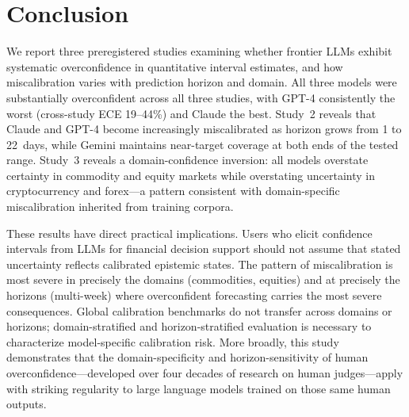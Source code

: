 \section{Conclusion}

We report three preregistered studies examining whether frontier LLMs exhibit
systematic overconfidence in quantitative interval estimates, and how
miscalibration varies with prediction horizon and domain. All three models
were substantially overconfident across all three studies, with GPT-4
consistently the worst (cross-study ECE 19--44\%) and Claude the best.
Study~2 reveals that Claude and GPT-4 become increasingly miscalibrated as
horizon grows from 1 to 22~days, while Gemini maintains near-target coverage
at both ends of the tested range. Study~3 reveals a domain-confidence
inversion: all models overstate certainty in commodity and equity markets
while overstating uncertainty in cryptocurrency and forex---a pattern
consistent with domain-specific miscalibration inherited from training corpora.

These results have direct practical implications. Users who elicit confidence
intervals from LLMs for financial decision support should not assume that
stated uncertainty reflects calibrated epistemic states. The pattern of
miscalibration is most severe in precisely the domains (commodities, equities)
and at precisely the horizons (multi-week) where overconfident forecasting
carries the most severe consequences. Global calibration benchmarks do not
transfer across domains or horizons; domain-stratified and
horizon-stratified evaluation is necessary to characterize model-specific
calibration risk. More broadly, this study demonstrates that the
domain-specificity and horizon-sensitivity of human overconfidence---developed
over four decades of research on human judges---apply with striking regularity
to large language models trained on those same human outputs.


